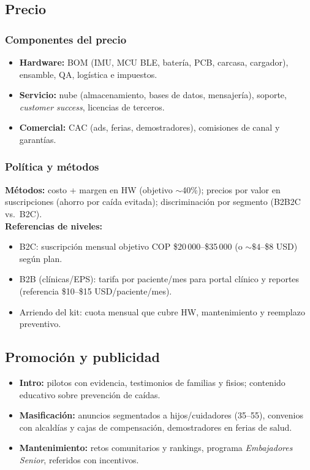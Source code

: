 \subsection{Precio}

\subsubsection{Componentes del precio}
\begin{itemize}
    \item \textbf{Hardware:} BOM (IMU, MCU BLE, batería, PCB, carcasa, cargador), ensamble, QA, logística e impuestos.
    \item \textbf{Servicio:} nube (almacenamiento, bases de datos, mensajería), soporte, \emph{customer success}, licencias de terceros.
    \item \textbf{Comercial:} CAC (ads, ferias, demostradores), comisiones de canal y garantías.
\end{itemize}

\subsubsection{Política y métodos}
\textbf{Métodos:} costo + margen en HW (objetivo $\sim$40\%); precios por valor en suscripciones (ahorro por caída evitada); discriminación por segmento (B2B2C vs.\ B2C).\\
\textbf{Referencias de niveles:} 
\begin{itemize}
    \item B2C: suscripción mensual objetivo COP \$20\,000--\$35\,000 (o $\sim\$4$--\$8 USD) según plan.
    \item B2B (clínicas/EPS): tarifa por paciente/mes para portal clínico y reportes (referencia \$10--\$15 USD/paciente/mes).
    \item Arriendo del kit: cuota mensual que cubre HW, mantenimiento y reemplazo preventivo.
\end{itemize}

\subsection{Promoción y publicidad}
\begin{itemize}
    \item \textbf{Intro:} pilotos con evidencia, testimonios de familias y fisios; contenido educativo sobre prevención de caídas.
    \item \textbf{Masificación:} anuncios segmentados a hijos/cuidadores (35--55), convenios con alcaldías y cajas de compensación, demostradores en ferias de salud.
    \item \textbf{Mantenimiento:} retos comunitarios y rankings, programa \emph{Embajadores Senior}, referidos con incentivos.
\end{itemize}


